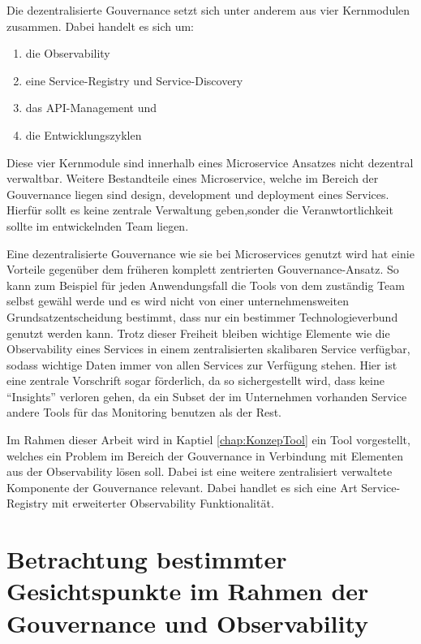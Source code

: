 \begin{definition}
	Die dezentralisierte Gouvernance setzt sich unter anderem aus vier Kernmodulen \autocite[S. 154]{microservice_enterprise} zusammen. Dabei handelt es sich um:
	\begin{enumerate}
		\item die Observability
		\item eine Service-Registry und Service-Discovery
		\item das API-Management und
		\item die Entwicklungszyklen
	\end{enumerate}
	Diese vier Kernmodule sind innerhalb eines Microservice Ansatzes nicht dezentral verwaltbar. Weitere Bestandteile eines Microservice, welche im Bereich der Gouvernance liegen sind design, development und deployment eines Services. Hierfür sollt es keine zentrale Verwaltung geben,\autocites[S. 154]{microservice_enterprise} [Decentralized Gouvernance]{FowlerMicrservices}sonder die Veranwtortlichkeit sollte im entwickelnden Team liegen.
\end{definition}

Eine dezentralisierte Gouvernance wie sie bei Microservices genutzt wird hat einie Vorteile gegenüber dem früheren komplett zentrierten Gouvernance-Ansatz. So kann zum Beispiel für jeden Anwendungsfall die Tools von dem zuständig Team selbst gewähl werde und es wird nicht von einer unternehmensweiten Grundsatzentscheidung bestimmt, dass nur ein bestimmer Technologieverbund genutzt werden kann. Trotz dieser Freiheit bleiben wichtige Elemente wie die Observability eines Services in einem zentralisierten skalibaren Service verfügbar, sodass wichtige Daten immer von allen Services zur Verfügung stehen. Hier ist eine zentrale Vorschrift sogar förderlich, da so sichergestellt wird, dass keine \enquote{Insights} verloren gehen, da ein Subset der im Unternehmen vorhanden Service andere Tools für das Monitoring benutzen als der Rest.

Im Rahmen dieser Arbeit wird in Kaptiel \vref{chap:KonzepTool} ein Tool vorgestellt, welches ein Problem im Bereich der Gouvernance in Verbindung mit Elementen aus der Observability lösen soll. Dabei ist eine weitere zentralisiert verwaltete Komponente der Gouvernance relevant. Dabei handlet es sich eine Art Service-Registry mit erweiterter Observability Funktionalität.

\section{Betrachtung bestimmter Gesichtspunkte im Rahmen der Gouvernance und Observability}

